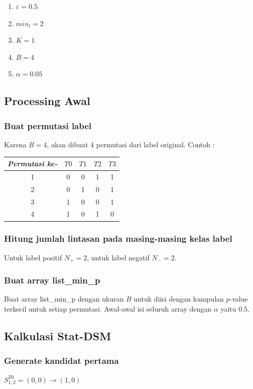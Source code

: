 \documentclass[a4paper,twoside]{article}
\begin{document}
\begin{enumerate}
    \item $\varepsilon = 0.5$
    \item $min_l = 2$
    \item $K = 1$
    \item $B = 4$
    \item $\alpha = 0.05$
\end{enumerate}

\subsection{Processing Awal}
\subsubsection{Buat permutasi label}
Karena $B = 4$, akan dibuat 4 permutasi dari label original.
Contoh :
\begin{table}[H]
    \centering
    \begin{tabular}{c|cccc}
        \toprule
        \textit{Permutasi ke-} & $T0$ & $T1$ & $T2$ & $T3$ \\
        \midrule
        1 & 0 & 0 & 1 & 1 \\
        2 & 0 & 1 & 0 & 1 \\
        3 & 1 & 0 & 0 & 1 \\
        4 & 1 & 0 & 1 & 0 \\
        \bottomrule
    \end{tabular}
\end{table}

\subsubsection{Hitung jumlah lintasan pada masing-masing kelas label}
Untuk label positif $N_+ = 2$, untuk label negatif $N_- = 2$.

\subsubsection{{Buat array list\_min\_p}}
Buat array list\_min\_p dengan ukuran $B$ untuk diisi dengan kumpulan $p$-value terkecil untuk setiap permutasi. 
Awal-awal isi seluruh array dengan $\alpha$ yaitu $0.5$. 

\subsection{Kalkulasi Stat-DSM}
\subsubsection{Generate kandidat pertama}
$S_{1,2}^{T0} = (0, 0) \rightarrow (1, 0)$
\end{document}
